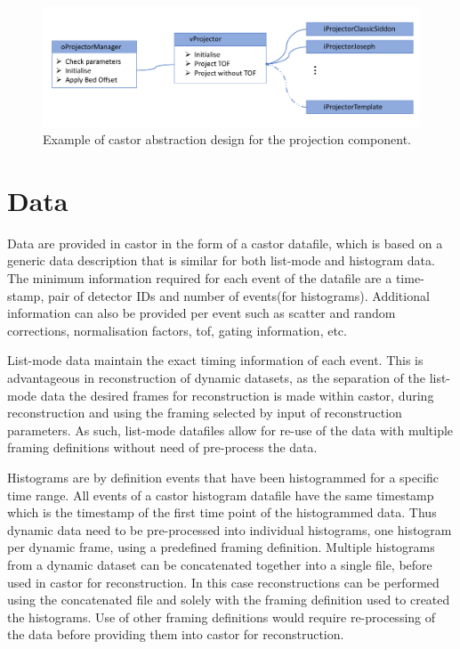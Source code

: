 \begin{figure} [h!]
\centering
\includegraphics[scale=0.50,angle=0]{2_Theory_Methods/figures/oProjectorManager.pdf}
\caption{Example of \gls{castor} abstraction design for the projection component.} 
\label{fig_2_4:oProjectorManager}
\end{figure}


\section{Data}
Data are provided in \gls{castor} in the form of a \gls{castor} datafile, which is based on a generic data description that is similar for both list-mode and histogram data. 
The minimum information required for each event of the datafile are a time-stamp, pair of detector IDs and number of events(for histograms). Additional information can also be provided per event such as scatter and random corrections, normalisation factors, \gls{tof}, gating information, etc. 

List-mode data maintain the exact timing information of each event. This is advantageous in reconstruction of dynamic datasets, as the separation of the list-mode data the desired frames for reconstruction is made within \gls{castor}, during reconstruction and using the framing selected by input of reconstruction parameters. As such, list-mode datafiles allow for re-use of the data with multiple framing definitions without need of pre-process the data. 

Histograms are by definition events that have been histogrammed for a specific time range. All events of a \gls{castor} histogram datafile have the same timestamp which is the timestamp of the first time point of the histogrammed data. Thus dynamic data need to be pre-processed into individual histograms, one histogram per dynamic frame, using a predefined framing definition.
Multiple histograms from a dynamic dataset can be concatenated together into a single file, before used in \gls{castor} for reconstruction. In this case reconstructions can be performed using the concatenated file and solely with the framing definition used to created the histograms. 
Use of other framing definitions would require re-processing of the data before providing them into \gls{castor} for reconstruction.

